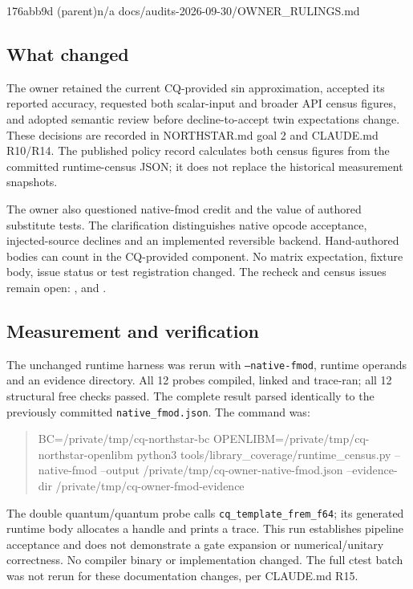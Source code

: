 %
  {176abb9d (parent)}{n/a}%
  {docs/audits-2026-09-30/OWNER\_RULINGS.md}

\subsection*{What changed}
The owner retained the current CQ-provided sin approximation, accepted its reported
accuracy, requested both scalar-input and broader API census figures, and adopted
semantic review before decline-to-accept twin expectations change. These decisions
are recorded in NORTHSTAR.md goal 2 and CLAUDE.md R10/R14. The published policy
record calculates both census figures from the committed runtime-census JSON;
it does not replace the historical measurement snapshots.

The owner also questioned native-fmod credit and the value of authored substitute
tests. The clarification distinguishes native opcode acceptance, injected-source
declines and an implemented reversible backend. Hand-authored bodies can count in
the CQ-provided component. No matrix expectation, fixture body, issue status or
test registration changed. The recheck and census issues remain open:
,  and .

\subsection*{Measurement and verification}
The unchanged runtime harness was rerun with \texttt{--native-fmod}, runtime
operands and an evidence directory. All 12 probes compiled, linked and trace-ran;
all 12 structural free checks passed. The complete result parsed identically to
the previously committed \texttt{native\_fmod.json}. The command was:

\begin{quote}\small\ttfamily
BC=/private/tmp/cq-northstar-bc\newline
OPENLIBM=/private/tmp/cq-northstar-openlibm\newline
python3 tools/library\_coverage/runtime\_census.py\newline
--native-fmod --output /private/tmp/cq-owner-native-fmod.json\newline
--evidence-dir /private/tmp/cq-owner-fmod-evidence
\end{quote}

The double quantum/quantum probe calls \texttt{cq\_template\_frem\_f64}; its
generated runtime body allocates a handle and prints a trace. This run establishes
pipeline acceptance and does not demonstrate a gate expansion or numerical/unitary
correctness. No compiler binary or implementation changed. The full ctest batch
was not rerun for these documentation changes, per CLAUDE.md R15.

